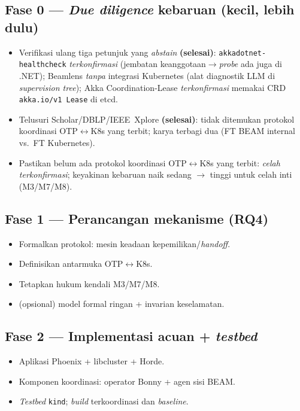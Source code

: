 \subsection*{Fase 0 --- \emph{Due diligence} kebaruan (kecil, lebih dulu)}
\begin{itemize}[leftmargin=2.2em,nosep]
  \item[\cbdone] Verifikasi ulang tiga petunjuk yang \emph{abstain} \textbf{(selesai)}:
        \texttt{akkadotnet-healthcheck} \emph{terkonfirmasi} (jembatan keanggotaan$\rightarrow$\emph{probe}
        ada juga di .NET); Beamlens \emph{tanpa} integrasi Kubernetes (alat diagnostik LLM di
        \emph{supervision tree}); Akka Coordination-Lease \emph{terkonfirmasi} memakai CRD
        \texttt{akka.io/v1 Lease} di etcd.
  \item[\cbdone] Telusuri Scholar/DBLP/IEEE~Xplore \textbf{(selesai)}: tidak ditemukan protokol
        koordinasi OTP$\leftrightarrow$K8s yang terbit; karya terbagi dua (FT BEAM internal
        vs.\ FT Kubernetes).
  \item[\cbdone] Pastikan belum ada protokol koordinasi OTP$\leftrightarrow$K8s yang terbit:
        \emph{celah terkonfirmasi}; keyakinan kebaruan naik sedang $\rightarrow$ tinggi untuk
        celah inti (M3/M7/M8).
\end{itemize}

\subsection*{Fase 1 --- Perancangan mekanisme (RQ4)}
\begin{itemize}[leftmargin=2.2em,nosep]
  \item[\cbtodo] Formalkan protokol: mesin keadaan kepemilikan/\emph{handoff}.
  \item[\cbtodo] Definisikan antarmuka OTP$\leftrightarrow$K8s.
  \item[\cbtodo] Tetapkan hukum kendali M3/M7/M8.
  \item[\cbtodo] (opsional) model formal ringan + invarian keselamatan.
\end{itemize}

\subsection*{Fase 2 --- Implementasi acuan + \emph{testbed}}
\begin{itemize}[leftmargin=2.2em,nosep]
  \item[\cbtodo] Aplikasi Phoenix + libcluster + Horde.
  \item[\cbtodo] Komponen koordinasi: operator Bonny + agen sisi BEAM.
  \item[\cbtodo] \emph{Testbed} \texttt{kind}; \emph{build} terkoordinasi dan \emph{baseline}.
\end{itemize}


